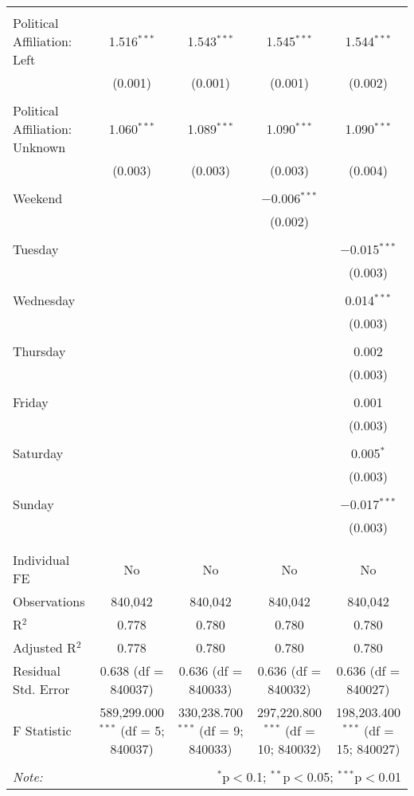 \documentclass[
]{article}
\begin{document}
\begin{table}[!htbp]
{\begin{tabular}{@{\extracolsep{5pt}}lcccc}
  & & & & \\ 
 Political Affiliation: Left & 1.516$^{***}$ & 1.543$^{***}$ & 1.545$^{***}$ & 1.544$^{***}$ \\ 
  & (0.001) & (0.001) & (0.001) & (0.002) \\ 
  & & & & \\ 
 Political Affiliation: Unknown & 1.060$^{***}$ & 1.089$^{***}$ & 1.090$^{***}$ & 1.090$^{***}$ \\ 
  & (0.003) & (0.003) & (0.003) & (0.004) \\ 
  & & & & \\ 
 Weekend &  &  & $-$0.006$^{***}$ &  \\ 
  &  &  & (0.002) &  \\ 
  & & & & \\ 
 Tuesday &  &  &  & $-$0.015$^{***}$ \\ 
  &  &  &  & (0.003) \\ 
  & & & & \\ 
 Wednesday &  &  &  & 0.014$^{***}$ \\ 
  &  &  &  & (0.003) \\ 
  & & & & \\ 
 Thursday &  &  &  & 0.002 \\ 
  &  &  &  & (0.003) \\ 
  & & & & \\ 
 Friday &  &  &  & 0.001 \\ 
  &  &  &  & (0.003) \\ 
  & & & & \\ 
 Saturday &  &  &  & 0.005$^{*}$ \\ 
  &  &  &  & (0.003) \\ 
  & & & & \\ 
 Sunday &  &  &  & $-$0.017$^{***}$ \\ 
  &  &  &  & (0.003) \\ 
  & & & & \\ 
\hline \\[-1.8ex] 
Individual FE & No & No & No & No \\ 
Observations & 840,042 & 840,042 & 840,042 & 840,042 \\ 
R$^{2}$ & 0.778 & 0.780 & 0.780 & 0.780 \\ 
Adjusted R$^{2}$ & 0.778 & 0.780 & 0.780 & 0.780 \\ 
Residual Std. Error & 0.638 (df = 840037) & 0.636 (df = 840033) & 0.636 (df = 840032) & 0.636 (df = 840027) \\ 
F Statistic & 589,299.000$^{***}$ (df = 5; 840037) & 330,238.700$^{***}$ (df = 9; 840033) & 297,220.800$^{***}$ (df = 10; 840032) & 198,203.400$^{***}$ (df = 15; 840027) \\ 
\hline 
\hline \\[-1.8ex] 
\textit{Note:}  & \multicolumn{4}{r}{$^{*}$p$<$0.1; $^{**}$p$<$0.05; $^{***}$p$<$0.01} \\ 
\end{tabular}
} 
\end{table} 
\newpage
\end{document}
